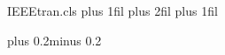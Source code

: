\begin{filecontents*}[overwrite]{IEEEtran.cls}
\@dblfptop 0pt plus 1fil
\baselineskip plus 2fil
\@dblfpbot 0pt plus 1fil
\def\dbltopfraction{0.8}
\def\dblfloatpagefraction{0.8}
\setcounter{dbltopnumber}{4}

\baselineskip plus 0.2\baselineskip minus  0.2\baselineskip
\setcounter{topnumber}{2}
\setcounter{bottomnumber}{2}
\setcounter{totalnumber}{4}



\newlength\abovecaptionskip
\newlength\belowcaptionskip
\setlength{}
\ifCLASSOPTIONcompsoc\ifCLASSOPTIONjournal
  \setlength{}
\fi\fi
\setlength\belowcaptionskip{0pt}
\def\@IEEEfigurecaptionsepspace{\vskip\abovecaptionskip\relax}%
\def\@IEEEtablecaptionsepspace{\vskip\abovecaptionskip\relax}%


\def\@IEEEtablestring{table}


\def\@IEEEfiguretopskipspace{\ifdim\prevdepth=-1000pt\relax
\setlength{\@IEEEtrantmpdimenA}{1\topskip}\relax
\addtolength{\@IEEEtrantmpdimenA}{-0.7\@IEEEnormalsizeunitybaselineskip}\relax
\vspace*{\@IEEEtrantmpdimenA}\fi}
\def\@IEEEtabletopskipstrut{\ifdim\prevdepth=-1000pt\rule{0pt}{\topskip}\fi}



\end{filecontents*}
